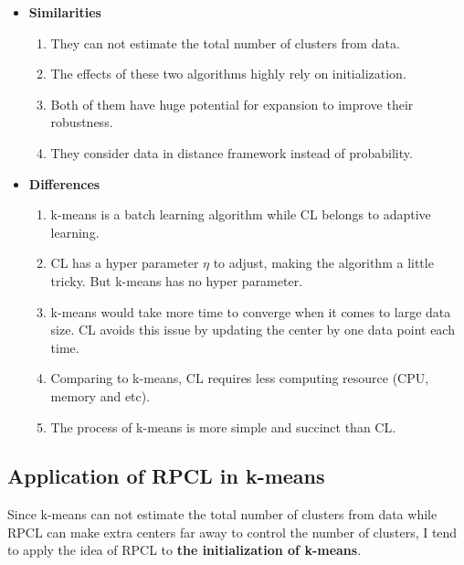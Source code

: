 \documentclass[12pt,a4paper]{article}
\theoremstyle{definition}
\begin{document}
\begin{itemize}
	\item \textbf{Similarities}
	
	\begin{enumerate}
		\item They can not estimate the total number of clusters from data.
		
		\item The effects of these two algorithms highly rely on initialization.
		
		\item Both of them have huge potential for expansion to improve their robustness.
		
		\item They consider data in distance framework instead of probability.
	\end{enumerate}
	
	\item \textbf{Differences}
	
	\begin{enumerate}
		\item k-means is a batch learning algorithm while CL belongs to adaptive learning.
		
		\item CL has a hyper parameter $\eta$ to adjust, making the algorithm a little tricky. But k-means has no hyper parameter.
		
		\item k-means would take more time to converge when it comes to large data size. CL avoids this issue by updating the center by one data point each time.
		
		\item Comparing to k-means, CL requires less computing resource (CPU, memory and etc).

		\item The process of k-means is more simple and succinct than CL.
	\end{enumerate}
\end{itemize}

\subsection{Application of RPCL in k-means}

Since k-means can not estimate the total number of clusters from data while RPCL can make extra centers far away to control the number of clusters, I tend to apply the idea of RPCL to \textbf{the initialization of k-means}.
\end{document}
